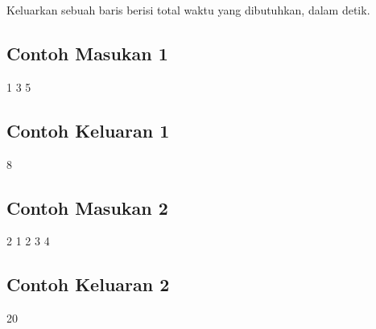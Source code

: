 \documentclass[../main_problemset.tex]{subfiles} %
\begin{document}
Keluarkan sebuah baris berisi total waktu yang dibutuhkan, dalam detik.

\vspace*{.4cm}

\begin{minipage}[t]{0.5\textwidth}
\subsection*{Contoh Masukan 1}

\begin{lcverbatim}
1
3
5
\end{lcverbatim}
\end{minipage}
\begin{minipage}[t]{0.5\textwidth}
\subsection*{Contoh Keluaran 1}

\begin{lcverbatim}
8
\end{lcverbatim}
\end{minipage}

\vspace*{.4cm}

\begin{minipage}[t]{0.5\textwidth}
\subsection*{Contoh Masukan 2}

\begin{lcverbatim}
2
1 2
3 4
\end{lcverbatim}
\end{minipage}
\begin{minipage}[t]{0.5\textwidth}
\subsection*{Contoh Keluaran 2}

\begin{lcverbatim}
20
\end{lcverbatim}
\end{minipage}
\end{document}
